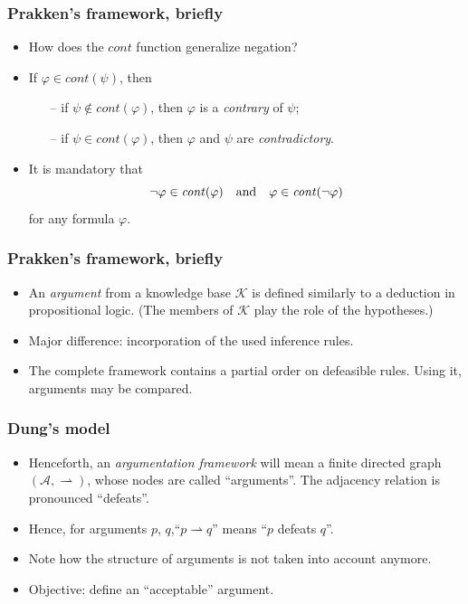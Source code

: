 \documentclass{beamer}
\begin{document}
\begin{frame}
\frametitle{Prakken's framework, briefly}
\begin{itemize}
\item How does the $\mathit{cont}$ function generalize negation? \pause
\item If \( \varphi \in \mathit{cont}(\psi) \), then
  \begin{itemize}
  \item[--] if \( \psi \not\in \mathit{cont}(\varphi) \), then $\varphi$ is a \emph{contrary} of $\psi$;
  \item[--] if \( \psi \in \mathit{cont}(\varphi) \), then $\varphi$ and $\psi$ are \emph{contradictory}.
  \end{itemize} \pause
\item It is mandatory that \[ \neg\varphi \in \mathit{cont}(\varphi) \mbox{\quad and\quad } \varphi \in \mathit{cont}(\neg\varphi) \] for any formula $\varphi$.
\end{itemize}
\end{frame}

\begin{frame}
\frametitle{Prakken's framework, briefly}
\begin{itemize}
\item An \emph{argument} from a knowledge base $\mathcal{K}$ is defined similarly to a deduction in propositional logic. (The members of $\mathcal{K}$ play the role of the hypotheses.) \pause
\item Major difference: incorporation of the used inference rules. \pause
\item The complete framework contains a partial order on defeasible rules. Using it, arguments may be compared.
\end{itemize}
\end{frame}

\begin{frame}
\frametitle{Dung's model}
\begin{itemize}
\item Henceforth, an \emph{argumentation framework} will mean a finite directed graph \( (\mathcal{A}, \rightharpoonup) \), whose nodes are called ``arguments''. The adjacency relation is pronounced ``defeats''. \pause
\item Hence, for arguments $p$, $q$,\quad ``$p \rightharpoonup q$'' means ``$p$ defeats $q$''. \pause
\item Note how the structure of arguments is not taken into account anymore. \pause
\item Objective: define an ``acceptable'' argument.
\end{itemize}
\end{frame}
\end{document}
